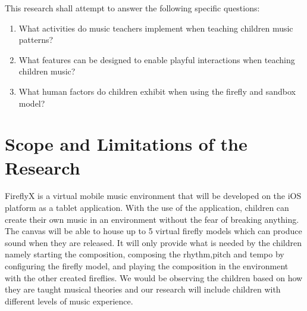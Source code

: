 %
%
This research shall attempt to answer the following specific questions:
\begin{enumerate}
\item What activities do music teachers implement when teaching children music patterns?
\item What features can be designed to enable playful interactions when teaching children music?
\item What human factors do children exhibit when using the firefly and sandbox model?
\end{enumerate}


\section{Scope and Limitations of the Research}
\label{sec:scopelimitations}

    FireflyX is a virtual mobile music environment that will be developed on the iOS platform as a tablet application. With the use of the application, children can create their own music in an environment without the fear of breaking anything. The canvas will be able to house up to 5 virtual firefly models which can produce sound when they are released. It will only provide what is needed by the children namely starting the composition, composing the rhythm,pitch and tempo by configuring the firefly model, and playing the composition in the environment with the other created fireflies. We would be observing the children based on how they are taught musical theories and our research will include children with different levels of music experience.
    
